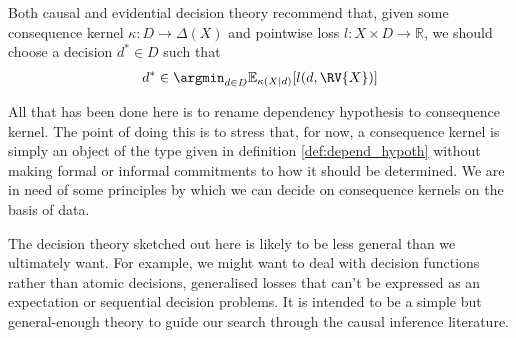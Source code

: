 Both causal and evidential decision theory recommend that, given some consequence kernel $\kappa:D\to \Delta(X)$ and pointwise loss $l:X\times D\to\mathbb{R}$, we should choose a decision $d^*\in D$ such that 
\begin{align}
    d^* \in \argmin_{d\in D} \mathbb{E}_{\kappa(X|d)}[l(d,\RV{X})] 
\end{align}

All that has been done here is to rename dependency hypothesis to consequence kernel. The point of doing this is to stress that, for now, a consequence kernel is simply an object of the type given in definition \ref{def:depend_hypoth} without making formal or informal commitments to how it should be determined. We are in need of some principles by which we can decide on consequence kernels on the basis of data.

The decision theory sketched out here is likely to be less general than we ultimately want. For example, we might want to deal with decision functions rather than atomic decisions, generalised losses that can't be expressed as an expectation or sequential decision problems. It is intended to be a simple but general-enough theory to guide our search through the causal inference literature.
